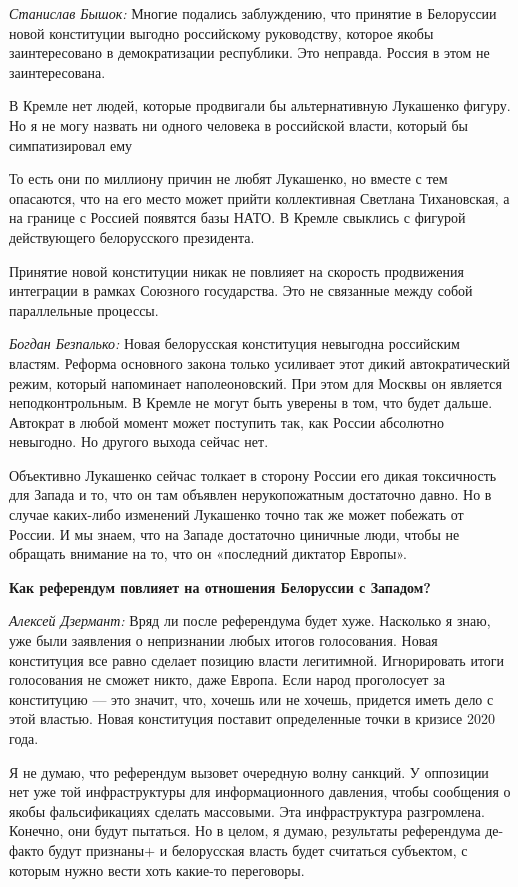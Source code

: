 \textit{Станислав Бышок:} Многие подались заблуждению, что принятие в Белоруссии новой конституции выгодно российскому руководству, которое якобы заинтересовано в демократизации республики. Это неправда. Россия в этом не заинтересована.

\begin{fancyquotes}
    В Кремле нет людей, которые продвигали бы альтернативную Лукашенко фигуру. Но я не могу назвать ни одного человека в российской власти, который бы симпатизировал ему
\end{fancyquotes}

То есть они по миллиону причин не любят Лукашенко, но вместе с тем опасаются, что на его место может прийти коллективная Светлана Тихановская, а на границе с Россией появятся базы НАТО. В Кремле свыклись с фигурой действующего белорусского президента.

Принятие новой конституции никак не повлияет на скорость продвижения интеграции в рамках Союзного государства. Это не связанные между собой параллельные процессы.

\textit{Богдан Безпалько:} Новая белорусская конституция невыгодна российским властям. Реформа основного закона только усиливает этот дикий автократический режим, который напоминает наполеоновский. При этом для Москвы он является неподконтрольным. В Кремле не могут быть уверены в том, что будет дальше. Автократ в любой момент может поступить так, как России абсолютно невыгодно. Но другого выхода сейчас нет.

Объективно Лукашенко сейчас толкает в сторону России его дикая токсичность для Запада и то, что он там объявлен нерукопожатным достаточно давно. Но в случае каких-либо изменений Лукашенко точно так же может побежать от России. И мы знаем, что на Западе достаточно циничные люди, чтобы не обращать внимание на то, что он «последний диктатор Европы».

\textbf{Как референдум повлияет на отношения Белоруссии с Западом?}

\textit{Алексей Дзермант:} Вряд ли после референдума будет хуже. Насколько я знаю, уже были заявления о непризнании любых итогов голосования. Новая конституция все равно сделает позицию власти легитимной. Игнорировать итоги голосования не сможет никто, даже Европа. Если народ проголосует за конституцию — это значит, что, хочешь или не хочешь, придется иметь дело с этой властью. Новая конституция поставит определенные точки в кризисе 2020 года.

Я не думаю, что референдум вызовет очередную волну санкций. У оппозиции нет уже той инфраструктуры для информационного давления, чтобы сообщения о якобы фальсификациях сделать массовыми. Эта инфраструктура разгромлена. Конечно, они будут пытаться. Но в целом, я думаю, результаты референдума де-факто будут признаны+ и белорусская власть будет считаться субъектом, с которым нужно вести хоть какие-то переговоры.

